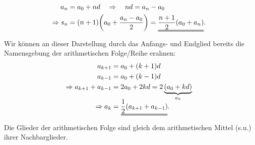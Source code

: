 \begin{align}
    a_n &= a_0 + n d \quad \Rightarrow \quad nd = a_n - a_0 \notag \\
    \Rightarrow s_n &= (n+1)\qty(a_0 + \frac{a_n -a_0}{2}) = \uuline{\frac{n+1}{2}(a_0 + a_n)}.
\end{align}
Wir können an dieser Darstellung durch das Anfangs- und Endglied bereits die Namensgebung der arithmetischen Folge/Reihe erahnen: 
\begin{align}
    a_{k+1} &= a_0 + (k+1)d \notag \\
    a_{k-1} &= a_0 + (k-1)d \notag \\
    \Rightarrow a_{k+1} + a_{k-1} &= 2 a_0 +2kd = 2\underbrace{(a_0 + kd)}_{a_k} \notag \\[-2mm]
    \Rightarrow a_k &= \uuline{\frac{1}{2}(a_{k+1}+a_{k-1})}.
\end{align}
Die Glieder der arithmetischen Folge sind gleich dem arithmetischen Mittel (s.u.) ihrer Nachbarglieder.

